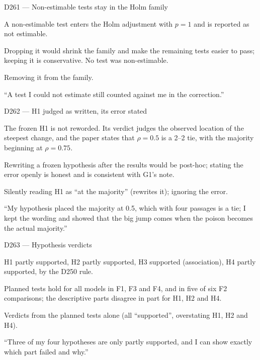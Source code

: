 \documentclass[11pt,a4paper]{report}
\begin{document}
\begin{decisionbox}{D261 --- Non-estimable tests stay in the Holm family}
\begin{description}[nosep, leftmargin=0pt]
  \item[Decision.] A non-estimable test enters the Holm adjustment with $p=1$ and is reported as not estimable.
  \item[Why.] Dropping it would shrink the family and make the remaining tests easier to pass; keeping it is conservative. No test was non-estimable.
  \item[Alternatives.] Removing it from the family.
  \item[Interview line.] ``A test I could not estimate still counted against me in the correction.''
\end{description}
\end{decisionbox}

\begin{decisionbox}{D262 --- H1 judged as written, its error stated}
\begin{description}[nosep, leftmargin=0pt]
  \item[Decision.] The frozen H1 is not reworded. Its verdict judges the observed location of the steepest change, and the paper states that $\rho=0.5$ is a 2--2 tie, with the majority beginning at $\rho=0.75$.
  \item[Why.] Rewriting a frozen hypothesis after the results would be post-hoc; stating the error openly is honest and is consistent with G1's note.
  \item[Alternatives.] Silently reading H1 as ``at the majority'' (rewrites it); ignoring the error.
  \item[Interview line.] ``My hypothesis placed the majority at 0.5, which with four passages is a tie; I kept the wording and showed that the big jump comes when the poison becomes the actual majority.''
\end{description}
\end{decisionbox}

\begin{decisionbox}{D263 --- Hypothesis verdicts}
\begin{description}[nosep, leftmargin=0pt]
  \item[Decision.] H1 partly supported, H2 partly supported, H3 supported (association), H4 partly supported, by the D250 rule.
  \item[Why.] Planned tests hold for all models in F1, F3 and F4, and in five of six F2 comparisons; the descriptive parts disagree in part for H1, H2 and H4.
  \item[Alternatives.] Verdicts from the planned tests alone (all ``supported'', overstating H1, H2 and H4).
  \item[Interview line.] ``Three of my four hypotheses are only partly supported, and I can show exactly which part failed and why.''
\end{description}
\end{decisionbox}
\end{document}
